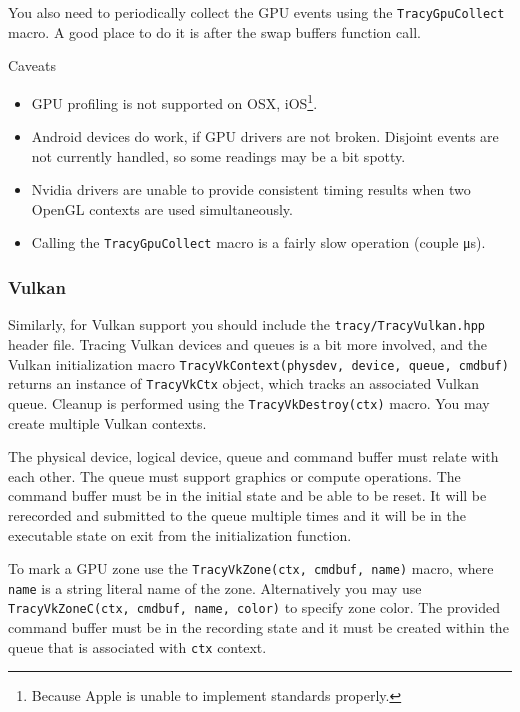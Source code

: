 \documentclass[hidelinks,titlepage,a4paper]{article}
\begin{document}
You also need to periodically collect the GPU events using the \texttt{TracyGpuCollect} macro. A good place to do it is after the swap buffers function call.

\begin{bclogo}[
noborder=true,
couleur=black!5,
logo=\bcattention
]{Caveats}
\begin{itemize}
\item GPU profiling is not supported on OSX, iOS\footnote{Because Apple is unable to implement standards properly.}.
\item Android devices do work, if GPU drivers are not broken. Disjoint events are not currently handled, so some readings may be a bit spotty.
\item Nvidia drivers are unable to provide consistent timing results when two OpenGL contexts are used simultaneously.
\item Calling the \texttt{TracyGpuCollect} macro is a fairly slow operation (couple \si{\micro\second}).
\end{itemize}
\end{bclogo}

\subsubsection{Vulkan}

Similarly, for Vulkan support you should include the \texttt{tracy/TracyVulkan.hpp} header file. Tracing Vulkan devices and queues is a bit more involved, and the Vulkan initialization macro \texttt{TracyVkContext(physdev, device, queue, cmdbuf)} returns an instance of \texttt{TracyVkCtx} object, which tracks an associated Vulkan queue. Cleanup is performed using the \texttt{TracyVkDestroy(ctx)} macro. You may create multiple Vulkan contexts.

The physical device, logical device, queue and command buffer must relate with each other. The queue must support graphics or compute operations. The command buffer must be in the initial state and be able to be reset. It will be rerecorded and submitted to the queue multiple times and it will be in the executable state on exit from the initialization function.

To mark a GPU zone use the \texttt{TracyVkZone(ctx, cmdbuf, name)} macro, where \texttt{name} is a string literal name of the zone. Alternatively you may use \texttt{TracyVkZoneC(ctx, cmdbuf, name, color)} to specify zone color. The provided command buffer must be in the recording state and it must be created within the queue that is associated with \texttt{ctx} context.
\end{document}
